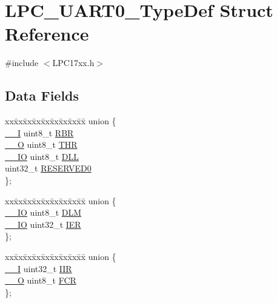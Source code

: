 \hypertarget{structLPC__UART0__TypeDef}{}\section{L\+P\+C\+\_\+\+U\+A\+R\+T0\+\_\+\+Type\+Def Struct Reference}
\label{structLPC__UART0__TypeDef}


{\ttfamily \#include $<$L\+P\+C17xx.\+h$>$}

\subsection*{Data Fields}
\begin{DoxyCompactItemize}
\item 
\begin{tabbing}
xx\=xx\=xx\=xx\=xx\=xx\=xx\=xx\=xx\=\kill
union \{\\
\>\hyperlink{LPC17xx_8h_af63697ed9952cc71e1225efe205f6cd3}{\_\_I} uint8\_t \hyperlink{structLPC__UART0__TypeDef_a9893b213067c84bbd233ded057adce7d}{RBR}\\
\>\hyperlink{LPC17xx_8h_a7e25d9380f9ef903923964322e71f2f6}{\_\_O} uint8\_t \hyperlink{structLPC__UART0__TypeDef_a6a75cbd28dbb9e5bb7ddd9c1dfd80443}{THR}\\
\>\hyperlink{LPC17xx_8h_aec43007d9998a0a0e01faede4133d6be}{\_\_IO} uint8\_t \hyperlink{structLPC__UART0__TypeDef_ab2ca502f17a630b5a86338ad625d0533}{DLL}\\
\>uint32\_t \hyperlink{structLPC__UART0__TypeDef_ad31c38487208185613f66b91060a4646}{RESERVED0}\\
\}; \\

\end{tabbing}\item 
\begin{tabbing}
xx\=xx\=xx\=xx\=xx\=xx\=xx\=xx\=xx\=\kill
union \{\\
\>\hyperlink{LPC17xx_8h_aec43007d9998a0a0e01faede4133d6be}{\_\_IO} uint8\_t \hyperlink{structLPC__UART0__TypeDef_afda673e1206992eedf39811ab80cb48f}{DLM}\\
\>\hyperlink{LPC17xx_8h_aec43007d9998a0a0e01faede4133d6be}{\_\_IO} uint32\_t \hyperlink{structLPC__UART0__TypeDef_a34da2683d8d0cbcfec0e7045fbe4b18e}{IER}\\
\}; \\

\end{tabbing}\item 
\begin{tabbing}
xx\=xx\=xx\=xx\=xx\=xx\=xx\=xx\=xx\=\kill
union \{\\
\>\hyperlink{LPC17xx_8h_af63697ed9952cc71e1225efe205f6cd3}{\_\_I} uint32\_t \hyperlink{structLPC__UART0__TypeDef_a34fd9f183c7716204ce85518eaebcf39}{IIR}\\
\>\hyperlink{LPC17xx_8h_a7e25d9380f9ef903923964322e71f2f6}{\_\_O} uint8\_t \hyperlink{structLPC__UART0__TypeDef_a670849e581f817faf960a28a9de631c0}{FCR}\\
\}; \\


\end{tabbing}
\end{DoxyCompactItemize}

